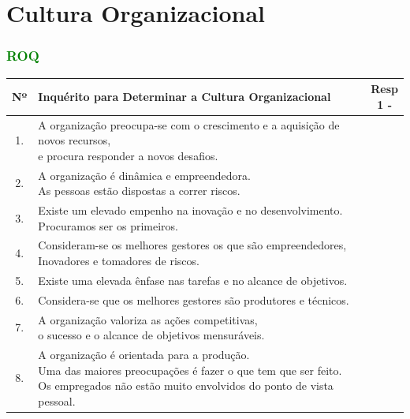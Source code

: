 \section{Cultura Organizacional}
\begin{frame}
\frametitle{\textcolor{green}{ROQ}}
\tiny
\begin{table}[h!]
\begin{adjustbox}{max width=\textwidth}
\begin{tabular}{ |c|l|c| }
\hline
\rowcolor[gray]{0.5}
Nº & Inquérito para Determinar a Cultura Organizacional & \makecell[l]{Resp \\ 1 \; - \; 7} \\
\hline
\cellcolor{brown} 1. & \makecell[l]{A organização preocupa-se com o crescimento e a aquisição de novos recursos, \\ e procura responder a novos desafios.} & \\
\hline
\cellcolor{brown} 2. & \makecell[l]{A organização é dinâmica e empreendedora. \\ As pessoas estão dispostas a correr riscos.} & \\
\hline
\cellcolor{brown} 3. & \makecell[l]{Existe um elevado empenho na inovação e no desenvolvimento. \\ Procuramos ser os primeiros.} & \\
\hline
\cellcolor{brown} 4. & \makecell[l]{Consideram-se os melhores gestores os que são empreendedores, \\ Inovadores e tomadores de riscos.} & \\
\hline
\cellcolor{red} 5. & Existe uma elevada ênfase nas tarefas e no alcance de objetivos. & \\
\hline
\cellcolor{red} 6. & Considera-se que os melhores gestores são produtores e técnicos. & \\
\hline
\cellcolor{red} 7. & \makecell[l]{A organização valoriza as ações competitivas, \\ o sucesso e o alcance de objetivos mensuráveis.} & \\
\hline
\cellcolor{red} 8. & \makecell[l]{A organização é orientada para a produção. \\ Uma das maiores preocupações é fazer o que tem que ser feito. \\ Os empregados não estão muito envolvidos do ponto de vista pessoal.} & \\

\end{tabular}
\end{adjustbox}
\end{table}
\end{frame}
